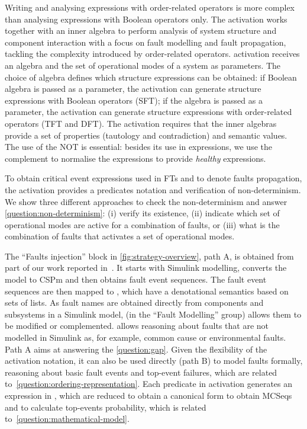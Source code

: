\documentclass[12pt,openright,twoside,a4paper,oldfontcommands,english,brazil,final]{abntex2}
\theoremstyle{theo}
\newcommand{\simulink}{Simulink\xspace}
\begin{document}
Writing and analysing expressions with order-related operators is more complex than analysing expressions with Boolean operators only.
The \ac{activation} works together with an inner algebra to perform analysis of system structure and component interaction with a focus on fault modelling and fault propagation, tackling the complexity introduced by order-related operators.
\ac{activation} receives an algebra and the set of operational modes of a system as parameters.
The choice of algebra defines which structure expressions can be obtained: if Boolean algebra is passed as a parameter, the \ac{activation} can generate structure expressions with Boolean operators (\ac{SFT}); if the \ac{algebra} is passed as a parameter, the \ac{activation} can generate structure expressions with order-related operators (\ac{TFT} and \ac{DFT}).
The \ac{activation} requires that the inner algebras provide a set of properties (tautology and contradiction) and semantic values.
The use of the \ac{NOT} is essential: besides its use in expressions, we use the complement to normalise the expressions to provide \emph{healthy} expressions.

To obtain critical event expressions used in \acp{FT} and to denote faults propagation, the \ac{activation} provides a predicates notation and verification of non-determinism. 
We show three different approaches to check the non-determinism and answer \cref{question:non-determinism}: (i) verify its existence, (ii) indicate which set of operational modes are active for a combination of faults, or (iii) what is the combination of faults that activates a set of operational modes.

The ``Faults injection'' block in \cref{fig:strategy-overview}, path A, is obtained from part of our work reported in~\cite{DM2012,Didier2012}.
It starts with \simulink modelling, converts the model to \ac{CSPm} and then obtains fault event sequences.
The fault event sequences are then mapped to , which have a denotational semantics based on sets of lists.
As fault names are obtained directly from components and subsystems in a \simulink model,  (in the ``Fault Modelling'' group) allows them to be modified or complemented.
 allows reasoning about faults that are not modelled in \simulink as, for example, common cause or environmental faults.
Path A aims at answering the \cref{question:gap}.
Given the flexibility of the \ac{activation} notation, it can also be used directly (path B) to model faults formally, reasoning about basic fault events and top-event failures, which are related to~\ref{question:ordering-representation}.
Each predicate in \ac{activation} generates an expression in , which are reduced to obtain a canonical form to obtain \acp{MCSeq} and to calculate top-events probability, which is related to~\ref{question:mathematical-model}.
\end{document}
